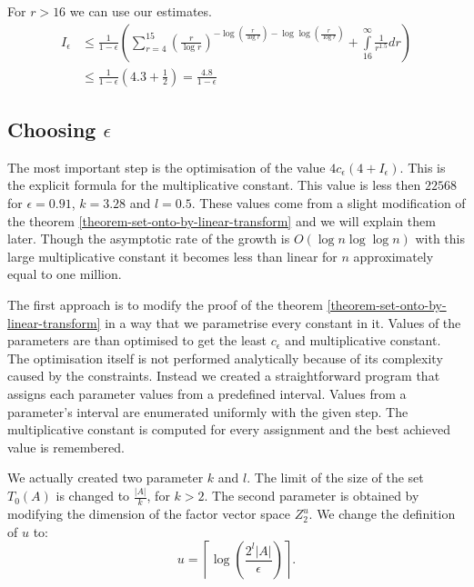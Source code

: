 For $r > 16$ we can use our estimates.
\begin{displaymath}
\begin{split}
I_{\epsilon} 
	& \leq \frac{1}{1 - \epsilon} \left( \displaystyle \sum_{r = 4}^{15} \left(\frac{r}{\log r}\right)^{-\log \left(\frac{r}{\log r}\right) - \log \log \left(\frac{r}{\log r}\right)} + \int\limits_{16}^\infty \frac{1}{r^{1.5}} dr \right) \\
	& \leq \frac{1}{1 - \epsilon} \left(4.3 + \frac{1}{2}\right) = \frac{4.8}{1-\epsilon}
\end{split}
\end{displaymath}

\subsection{Choosing $\epsilon$}
The most important step is the optimisation of the value $4 c_\epsilon (4 + I_{\epsilon})$. This is the explicit formula for the multiplicative constant. This value is less then $22 568$ for $\epsilon = 0.91$, $k = 3.28$ and $l = 0.5$. These values come from a slight modification of the theorem \ref{theorem-set-onto-by-linear-transform} and we will explain them later. Though the asymptotic rate of the growth is $O(\log n \log \log n)$ with this large multiplicative constant it becomes less than linear for $n$ approximately equal to one million.

The first approach is to modify the proof of the theorem \ref{theorem-set-onto-by-linear-transform} in a way that we parametrise every constant in it. Values of the parameters are than optimised to get the least $c_{\epsilon}$ and multiplicative constant. The optimisation itself is not performed analytically because of its complexity caused by the constraints. Instead we created a straightforward program that assigns each parameter values from a predefined interval. Values from a parameter's interval are enumerated uniformly with the given step. The multiplicative constant is computed for every assignment and the best achieved value is remembered.

We actually created two parameter $k$ and $l$. The limit of the size of the set $T_0(A)$ is changed to $\frac{|A|}{k}$, for $k > 2$. The second parameter is obtained by modifying the dimension of the factor vector space $Z_2^u$. We change the definition of $u$ to:
\begin{displaymath}
u = \left\lceil \log \left(\frac{2^l |A|}{\epsilon}\right) \right\rceil \textit{.}
\end{displaymath}

